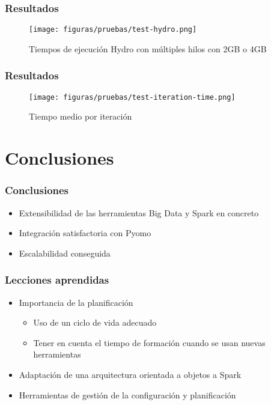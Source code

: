 \documentclass{beamer}
\begin{document}
\begin{frame}[plain]
    \frametitle{Resultados}
    \begin{figure}[H]
        \centerline{\texttt{[image: figuras/pruebas/test-hydro.png]}}
        \caption{Tiempos de ejecución Hydro con múltiples hilos con 2GB o 4GB}
        \label{fig:test-hydro}
    \end{figure}
\end{frame}

\begin{frame}[plain]
    \frametitle{Resultados}
    \begin{figure}[H]
        \centerline{\texttt{[image: figuras/pruebas/test-iteration-time.png]}}
        \caption{Tiempo medio por iteración}
        \label{fig:test-iteration-time}
    \end{figure}
\end{frame}

\section{Conclusiones}

\begin{frame}{}
    \frametitle{Conclusiones}
    \begin{itemize}
        \item Extensibilidad de las herramientas Big Data y Spark en concreto \pause
        \item Integración satisfactoria con Pyomo \pause
        \item Escalabilidad conseguida
    \end{itemize}
\end{frame}

\begin{frame}{}
    \frametitle{Lecciones aprendidas}
    \begin{itemize}
        \item Importancia de la planificación \pause
        \begin{itemize}
            \item Uso de un ciclo de vida adecuado
            \item Tener en cuenta el tiempo de formación cuando se usan nuevas herramientas \pause
        \end{itemize}
        \item Adaptación de una arquitectura orientada a objetos a Spark \pause
        \item Herramientas de gestión de la configuración y planificación 
    \end{itemize}
\end{frame}
\end{document}
